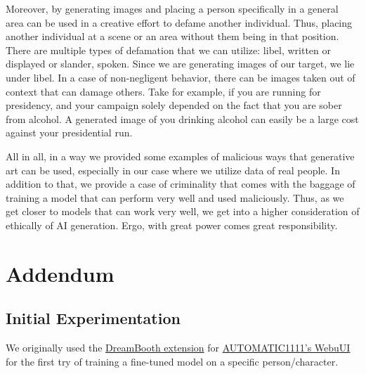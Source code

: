 \documentclass{article}
\begin{document}
Moreover, by generating images and placing a person specifically in a general area can be used in a creative effort to defame another individual. Thus, placing another individual at a scene or an area without them being in that position. There are multiple types of defamation that we can utilize: libel, written or displayed or slander, spoken. Since we are generating images of our target, we lie under libel. In a case of non-negligent behavior, there can be images taken out of context that can damage others. Take for example, if you are running for presidency, and your campaign solely depended on the fact that you are sober from alcohol. A generated image of you drinking alcohol can easily be a large cost against your presidential run.

All in all, in a way we provided some examples of malicious ways that generative art can be used, especially in our case where we utilize data of real people. In addition to that, we provide a case of criminality that comes with the baggage of training a model that can perform very well and used maliciously. Thus, as we get closer to models that can work very well, we get into a higher consideration of ethically of AI generation. Ergo, with great power comes great responsibility.

\section{Addendum}

\subsection{Initial Experimentation}
We originally used the \href{https://github.com/d8ahazard/sd_dreambooth_extension}{DreamBooth extension} for \href{https://github.com/AUTOMATIC1111/stable-diffusion-webui}{AUTOMATIC1111's WebuUI} for the first try of training a fine-tuned model on a specific person/character.
\end{document}
